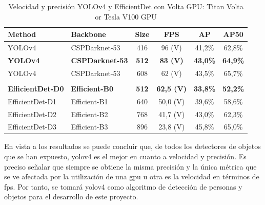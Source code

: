 \begin{table}[ht]
\centering
\caption{Velocidad y precisión YOLOv4 y EfficientDet con Volta GPU: Titan Volta or Tesla V100 GPU \cite{bochkovskiy2020yolov4} \cite{tan2020efficientdet}}
\label{tab:volta-speed-accuracy}
\begin{tabular}{llcccc}
\hline
\textbf{Method}          & \textbf{Backbone}      & \textbf{Size}        & \textbf{FPS}         & \textbf{AP}          & \textbf{AP50}        \\ \hline
YOLOv4                   & CSPDarknet-53          & 416                  & 96 (V)               & 41,2\%               & 62,8\%               \\
\textbf{YOLOv4}          & \textbf{CSPDarknet-53} & \textbf{512}         & \textbf{83 (V)}      & \textbf{43,0\%}      & \textbf{64,9\%}      \\
YOLOv4                   & CSPDarknet-53          & 608                  & 62 (V)               & 43,5\%               & 65,7\%               \\
                         &                        & \multicolumn{1}{l}{} & \multicolumn{1}{l}{} & \multicolumn{1}{l}{} & \multicolumn{1}{l}{} \\
\textbf{EfficientDet-D0} & \textbf{Efficient-B0}  & \textbf{512}         & \textbf{62,5 (V)}    & \textbf{33,8\%}      & \textbf{52,2\%}      \\
EfficientDet-D1          & Efficient-B1           & 640                  & 50,0 (V)             & 39,6\%               & 58,6\%               \\
EfficientDet-D2          & Efficient-B2           & 768                  & 41,7 (V)             & 43,0\%               & 62,3\%               \\
EfficientDet-D3          & Efficient-B3           & 896                  & 23,8 (V)             & 45,8\%               & 65,0\%               \\ \hline
\end{tabular}
\end{table}

En vista a los resultados se puede concluir que, de todos los detectores de objetos que se han expuesto, \gls{yolov4} es el mejor en cuanto a velocidad y precisión. Es preciso señalar que siempre se obtiene la misma precisión y la única métrica que se ve afectada por la utilización de una \gls{gpu} u otra es la velocidad en términos de \gls{fps}. Por tanto, se tomará \gls{yolov4} como algoritmo de detección de personas y objetos para el desarrollo de este proyecto.

